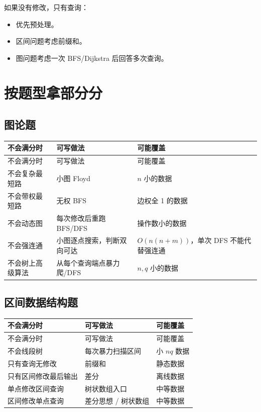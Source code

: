 如果没有修改，只有查询：

\begin{itemize}
  \item 优先预处理。
  \item 区间问题考虑前缀和。
  \item 图问题考虑一次 BFS/Dijkstra 后回答多次查询。
\end{itemize}

\section{按题型拿部分分}\label{sec:08-7}

\subsection{图论题}

\begin{longtable}{p{4cm}p{5cm}p{5cm}}
\toprule
不会满分时 & 可写做法 & 可能覆盖 \\
\midrule
\endfirsthead
\toprule
不会满分时 & 可写做法 & 可能覆盖 \\
\midrule
\endhead
不会复杂最短路 & 小图 Floyd & $n$ 小的数据 \\
不会带权最短路 & 无权 BFS & 边权全 1 的数据 \\
不会动态图 & 每次修改后重跑 BFS/DFS & 操作数小的数据 \\
不会强连通 & 小图逐点搜索，判断双向可达 & $O(n(n+m))$，单次 DFS 不能代替强连通 \\
不会树上高级算法 & 从每个查询端点暴力爬/DFS & $n,q$ 小的数据 \\
\bottomrule
\end{longtable}

\subsection{区间数据结构题}

\begin{longtable}{p{4cm}p{5cm}p{5cm}}
\toprule
不会满分时 & 可写做法 & 可能覆盖 \\
\midrule
\endfirsthead
\toprule
不会满分时 & 可写做法 & 可能覆盖 \\
\midrule
\endhead
不会线段树 & 每次暴力扫描区间 & 小 $nq$ 数据 \\
只有查询无修改 & 前缀和 & 静态数据 \\
只有区间修改最后输出 & 差分 & 离线数据 \\
单点修改区间查询 & 树状数组入口 & 中等数据 \\
区间修改单点查询 & 差分思想 / 树状数组 & 中等数据 \\
\bottomrule
\end{longtable}

